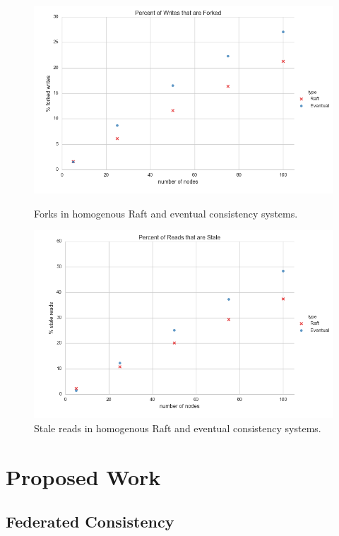 \documentclass{article}
\begin{document}
\begin{figure}[!h]
    \centering
      \includegraphics[width=\linewidth]{figures/scaling/forked_writes}
      \caption{Forks in homogenous Raft and eventual consistency systems.}\label{fig:scaling_forked_writes}
    \endminipage\hfill
      \includegraphics[width=\linewidth]{figures/scaling/stale_reads}
      \caption{Stale reads in homogenous Raft and eventual consistency systems.}\label{fig:scaling_stale_reads}
    \endminipage
\end{figure}

\section{Proposed Work}

\subsection{Federated Consistency}
\end{document}
